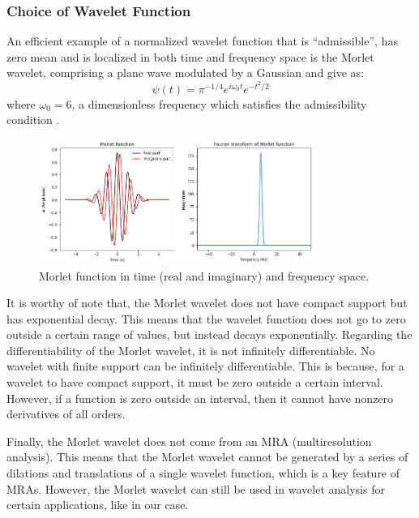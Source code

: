\documentclass{article}
\begin{document}
\subsubsection{Choice of Wavelet Function}
An efficient example of a normalized wavelet function that is “admissible”, has zero mean and is localized in both time and frequency space is the Morlet wavelet, comprising a plane wave modulated by a Gaussian \cite{doi:10.1146/annurev.fl.24.010192.002143}\cite{mertins1999signal}\cite{APracticalGuidetoWaveletAnalysis} and give as:
\begin{equation} 
\psi(t)= \pi^{-1/4}e^{i\omega_{0}t}e^{-t^2/2}
\end{equation}
where $\omega_{0}=6$, a dimensionless frequency which satisfies the admissibility condition \cite{doi:10.1146/annurev.fl.24.010192.002143}\cite{mertins1999signal}\cite{APracticalGuidetoWaveletAnalysis}.

\begin{figure}[h] 
\centering
\includegraphics[width=0.8\textwidth]{Morlet_Plot_Python.png}
\caption{ Morlet function in time (real and imaginary) and frequency space.} \label{fig:my_label}
\end{figure}

It is worthy of note that, the Morlet wavelet does not have compact support but has exponential decay. This means that the wavelet function does not go to zero outside a certain range of values, but instead decays exponentially. Regarding the differentiability of the Morlet wavelet, it is not infinitely differentiable. No wavelet with finite support can be infinitely differentiable. This is because, for a wavelet to have compact support, it must be zero outside a certain interval. However, if a function is zero outside an interval, then it cannot have nonzero derivatives of all orders.

Finally, the Morlet wavelet does not come from an MRA (multiresolution analysis). This means that the Morlet wavelet cannot be generated by a series of dilations and translations of a single wavelet function, which is a key feature of MRAs. However, the Morlet wavelet can still be used in wavelet analysis for certain applications, like in our case.
\end{document}
